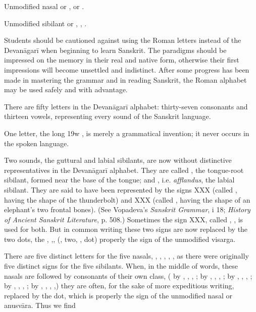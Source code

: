 Unmodified nasal or , {\dn {\rs -\re}\2}  or {\dn \1} .

Unmodified sibilant or , {\dn ,} .

Students should be cautioned against using the Roman letters instead of
the Devanāgarī when beginning to learn Sanskrit. The paradigms should be
impressed on the memory in their real and native form, otherwise their
first impressions will become unsettled and indistinct. After some
progress has been made in mastering the grammar and in reading Sanskrit,
the Roman alphabet may be used safely and with advantage.

\s There are fifty letters in the Devanāgarī alphabet: thirty-seven
consonants and thirteen vowels, representing every sound of the Sanskrit
language.

\s One letter, the long {\dn \319w} , is merely a grammatical
invention; it never occurs in the spoken language.

\s Two sounds, the guttural and labial sibilants, are now without
distinctive representatives in the Devanāgarī alphabet. They are called
, the tongue-root sibilant, formed near the base of the
tongue; and , i.e. \emph{afflandus}, the labial
sibilant. They are said to have been represented by the signs XXX
(called , having the shape of the thunderbolt) and XXX
(called , having the shape of an elephant's two
frontal bones). (See Vopadeva's \emph{Sanskrit Grammar}, i 18;
\emph{History of Ancient Sanskrit Literature}, p. 508.) Sometimes the
sign XXX, called , , is used for
both. But in common writing these two signs are now replaced by the two
dots, the , {\dn ,}, (, two, , dot) properly
the sign of the unmodified visarga.

\s There are five distinct letters for the five nasals, {\dn {}} ,
{\dn {}} , {\dn {}} , {\dn {}} , {\dn {}} , as there were
originally five distinct signs for the five sibilants. When, in the
middle of words, these nasals are followed by consonants of their own
class, ( by , , , ;  by ,
, , ;  by , , , ;
 by , , , ;  by , ,
, ,) they are often, for the sake of more expeditious
writing, replaced by the dot, which is properly the sign of the
unmodified nasal or anusvāra. Thus we find

